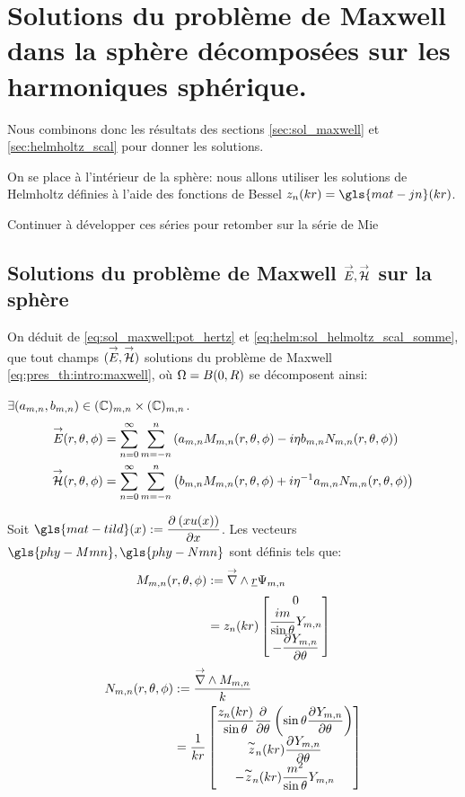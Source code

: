 \section{Solutions du problème de Maxwell dans la sphère décomposées sur les harmoniques sphérique.}\label{sec:maxwell_harmonique}

Nous combinons donc les résultats des sections \ref{sec:sol_maxwell} et \ref{sec:helmholtz_scal} pour donner les solutions.

On se place à l'intérieur de la sphère: nous allons utiliser les solutions de Helmholtz définies à l'aide des fonctions de Bessel \(z_n(kr) = \gls{mat-jn}(kr)\).


\begin{TODO}
  Continuer à développer ces séries pour retomber sur la série de Mie
\end{TODO}

\subsection{Solutions du problème de Maxwell \({\overset{\rightarrow}{E}},{\overset{\rightarrow}{\mathcal{H}}}\) sur la sphère}
On déduit de  \eqref{eq:sol_maxwell:pot_hertz} et \eqref{eq:helm:sol_helmoltz_scal_somme}, que tout champs \(({\overset{\rightarrow}{E}},{\overset{\rightarrow}{\mathcal{H}}})\) solutions du problème de Maxwell \eqref{eq:pres_th:intro:maxwell}, où \(\Omega = B(0,R)\) se décomposent ainsi:

\(\exists (a_{m,n},b_{m,n}) \in (\mathbb C)_{m,n}\times (\mathbb C)_{m,n}\).
\begin{align*}
  {\overset{\rightarrow}{E}}(r,\theta,\phi) &= \sum\limits_{n=0}^\infty\sum\limits_{m=-n}^n\left( a_{m,n}   M_{m,n}(r,\theta,\phi) - i \eta b_{m,n} N_{m,n}(r,\theta,\phi)\right)\\
  {\overset{\rightarrow}{\mathcal{H}}}(r,\theta,\phi) &= \sum\limits_{n=0}^\infty\sum\limits_{m=-n}^n\left( b_{m,n}   M_{m,n}(r,\theta,\phi) + i {\eta}^{-1} a_{m,n} N_{m,n}(r,\theta,\phi)\right)
\end{align*}

Soit \(\gls{mat-tild}(x) := \ddr{x}{\left(xu(x)\right)}\). Les vecteurs \(\gls{phy-Mmn} ,\gls{phy-Nmn}\) sont définis tels que:
\begin{align}
 \label{eq:defMmn}
  M_{m,n}(r,\theta,\phi) &:= {\overset{\rightarrow}{\nabla}}\wedge \underline{r} \Psi_{m,n} \\
  &= z_n(kr)
  \begin{bmatrix}
    0 \\ \dfrac{im}{\sin\theta}Y_{m,n}\\ 
    - \dfrac{\partial^{{}} Y_{m,n}}{{\partial \theta}^{{}}}
  \end{bmatrix}
\end{align}
\begin{align}
\label{eq:defNmn}
  N_{m,n}(r,\theta,\phi) &:= \dfrac{{\overset{\rightarrow}{\nabla}}\wedge M_{m,n}}{k} \\
  &= \dfrac{1}{kr}\begin{bmatrix}
    \dfrac{z_n(kr)}{\sin\theta}\dfrac{\partial^{{}} }{{\partial \theta}^{{}}}\left(\sin\theta\dfrac{\partial^{{}} Y_{m,n}}{{\partial \theta}^{{}}}\right)\\ 
    \overset{\thicksim}{z}_n(kr)\dfrac{\partial^{{}} Y_{m,n}}{{\partial \theta}^{{}}}\\ 
    -\overset{\thicksim}{z}_n(kr)\dfrac{m^2}{\sin\theta}Y_{m,n}\\
  \end{bmatrix} 
\end{align}


